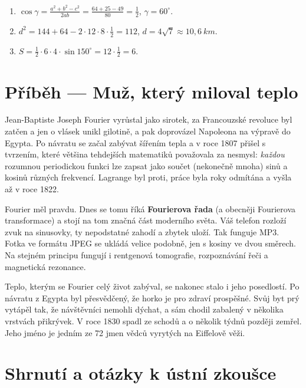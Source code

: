 \begin{solution}
  \begin{enumerate}[label=(\alph*)]
    \item $\cos\gamma = \frac{a^2 + b^2 - c^2}{2ab} = \frac{64 + 25 - 49}{80} = \frac{1}{2}$, $\gamma = 60^\circ$.
    \item $d^2 = 144 + 64 - 2\cdot 12\cdot 8\cdot\frac{1}{2} = 112$, $d = 4\sqrt{7}\approx 10{,}6\ \si{km}$.
    \item $S = \frac{1}{2}\cdot 6\cdot 4\cdot\sin 150^\circ = 12\cdot\frac{1}{2} = 6$.
  \end{enumerate}
\end{solution}

\section{Příběh --- Muž, který miloval teplo}

Jean-Baptiste Joseph Fourier vyrůstal jako sirotek, za Francouzské revoluce byl zatčen a jen o vlásek unikl gilotině, a pak doprovázel Napoleona na výpravě do Egypta. Po návratu se začal zabývat šířením tepla a v roce 1807 přišel s tvrzením, které většina tehdejších matematiků považovala za nesmysl: \textit{každou} rozumnou periodickou funkci lze zapsat jako součet (nekonečně mnoha) sinů a kosinů různých frekvencí. Lagrange byl proti, práce byla roky odmítána a vyšla až v roce 1822.

Fourier měl pravdu. Dnes se tomu říká \textbf{Fourierova řada} (a obecněji Fourierova transformace) a stojí na tom značná část moderního světa. Váš telefon rozloží zvuk na sinusovky, ty nepodstatné zahodí a zbytek uloží. Tak funguje MP3. Fotka ve formátu JPEG se ukládá velice podobně, jen s kosiny ve dvou směrech. Na stejném principu fungují i rentgenová tomografie, rozpoznávání řeči a magnetická rezonance.

Teplo, kterým se Fourier celý život zabýval, se nakonec stalo i jeho posedlostí. Po návratu z Egypta byl přesvědčený, že horko je pro zdraví prospěšné. Svůj byt prý vytápěl tak, že návštěvníci nemohli dýchat, a sám chodil zabalený v několika vrstvách přikrývek. V roce 1830 spadl ze schodů a o několik týdnů později zemřel. Jeho jméno je jedním ze 72 jmen vědců vyrytých na Eiffelově věži.

\section{Shrnutí a otázky k ústní zkoušce}

